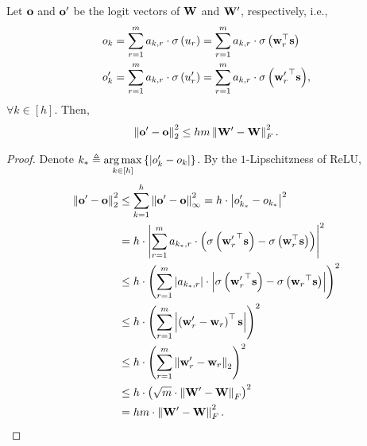 \begin{lem}
\label{lem:logit_upper_bound_parameter}
Let ${\mathbf{o}}$ and ${\mathbf{o}}^\prime$ be the logit vectors of  ${\mathbf{W}}$ and ${\mathbf{W}}^\prime$, respectively, i.e.,
\begin{equation*}
\begin{split}
    &o_{k} = \sum\limits_{r=1}^{m}{ a_{k,r} \cdot \sigma\left( u_{r} \right)} = \sum\limits_{r=1}^{m}{ a_{k,r} \cdot \sigma\left({\mathbf{w}}_r^\top {\mathbf{s}} \right)} \\
    &o_{k}^\prime = \sum\limits_{r=1}^{m}{ a_{k,r} \cdot \sigma\left( u_{r}^\prime \right)} = \sum\limits_{r=1}^{m}{ a_{k,r} \cdot \sigma\left({{\mathbf{w}}_r^\prime}^\top {\mathbf{s}} \right)},
\end{split}
\end{equation*}
$\forall k \in [h]$. Then,
\begin{equation*}
\begin{split}
    \left\| {\mathbf{o}}^\prime - {\mathbf{o}} \right\|_2^2 \le h m \left\| {\mathbf{W}}^\prime - {\mathbf{W}} \right\|_F^2.
\end{split}
\end{equation*}
\end{lem}
\begin{proof}
Denote $k_* \triangleq \operatorname*{arg\,max}\limits_{k \in [h]}\left\{ \left| o_{k}^\prime - o_{k} \right| \right\}$. By the $1$-Lipschitzness of ReLU,
\begin{equation*}
\begin{split}
    \left\| {\mathbf{o}}^\prime - {\mathbf{o}} \right\|_2^2 &\le \sum\limits_{k = 1}^{h}{ \left\| {\mathbf{o}}^\prime - {\mathbf{o}} \right\|_\infty^2} = h \cdot \left| o_{k_*}^\prime - o_{k_*} \right|^2 \\
    &= h \cdot \left| \sum\limits_{r=1}^{m}{ a_{k_*,r} \cdot \left( \sigma\left({{\mathbf{w}}_r^\prime}^\top {\mathbf{s}} \right) - \sigma\left({\mathbf{w}}_r^\top {\mathbf{s}} \right) \right)} \right|^2 \\
    &\le h \cdot \left( \sum\limits_{r=1}^{m}{ \left| a_{k_*,r} \right| \cdot \left| \sigma\left({{\mathbf{w}}_r^\prime}^\top {\mathbf{s}}\right) - \sigma\left({{\mathbf{w}}_r}^\top {\mathbf{s}}\right) \right|  } \right)^2 \\
    &\le h \cdot \left( \sum\limits_{r=1}^{m}{ \left| \left({{\mathbf{w}}_r^\prime} - {\mathbf{w}}_r \right)^\top {\mathbf{s}}\right|  } \right)^2 \\
    &\le h \cdot \left( \sum\limits_{r=1}^{m}{ \left\| {{\mathbf{w}}_r^\prime} - {\mathbf{w}}_r \right\|_2  } \right)^2 \\
    &\le h \cdot \left( \sqrt{m} \cdot \left\| {\mathbf{W}}^\prime - {\mathbf{W}} \right\|_F \right)^2 \\
    &= h m \cdot \left\| {\mathbf{W}}^\prime - {\mathbf{W}} \right\|_F^2. \qedhere
\end{split}
\end{equation*}
\end{proof}

